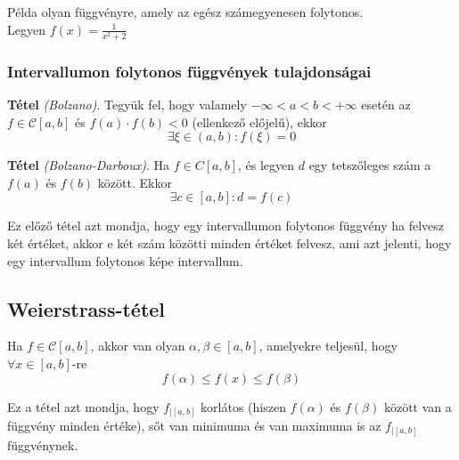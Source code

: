 \documentclass[tikz,12pt,margin=0px]{article}
\newcommand\ddfrac[2]{\frac{\displaystyle #1}{\displaystyle #2}}
\begin{document}
    \noindent Példa olyan függvényre, amely az egész számegyenesen folytonos.\\
    Legyen $f(x) = \ddfrac{1}{x^{2} + 2}$

    \begin{center}
    \end{center}

    \subsubsection*{Intervallumon folytonos függvények tulajdonságai}

	\textbf{Tétel} \emph{(Bolzano)}. Tegyük fel, hogy valamely $-\infty < a < b < +\infty$ esetén az\\
    $f \in \mathcal{C}[a,b]$ és $f(a) \cdot f(b) < 0$ (ellenkező előjelű), ekkor
    \[
        \exists \xi \in (a,b) : f(\xi) = 0
    \]

    \noindent \textbf{Tétel} \emph{(Bolzano-Darboux)}. Ha $f \in C[a,b]$, és legyen $d$ egy tetszőleges szám a $f(a)$ és $f(b)$ között. Ekkor
    \[
        \exists c \in [a,b] : d = f(c)
    \]

    \noindent Ez előző tétel azt mondja, hogy egy intervallumon folytonos függvény ha felvesz két értéket, akkor e két szám közötti minden értéket felvesz, ami azt jelenti, hogy egy intervallum folytonos képe intervallum.
	
	\subsection*{Weierstrass-tétel}
	
    \noindent Ha $f \in \mathcal{C}[a,b]$, akkor van olyan $\alpha, \beta \in [a,b]$, amelyekre teljesül, hogy $\forall x \in [a,b]$-re
    \[
        f(\alpha) \leq f(x) \leq f(\beta)
    \]

    \noindent Ez a tétel azt mondja, hogy $f_{\big|[a,b]}$ korlátos (hiszen $f(\alpha)$ és $f(\beta)$ között van a függvény minden értéke), sőt van minimuma és van maximuma is az $f_{\big|[a,b]}$ függvénynek. \\
\end{document}
